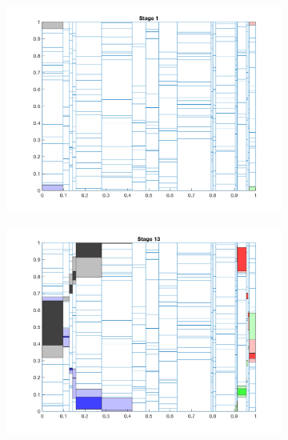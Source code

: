 \documentclass[11pt, letterpaper,titlepage,oneside]{article}
\begin{document}
\begin{figure}[H]
  \centering
  \begin{subfigure}{0.49\textwidth}
  \includegraphics[scale=0.5]{../figures/random_partition_1.png}
  \end{subfigure}
  \begin{subfigure}{0.49\textwidth}
  \includegraphics[scale=0.5]{../figures/random_partition_2.png}
  \end{subfigure}
  \begin{subfigure}{0.49\textwidth}

\end{subfigure}
\end{figure}
\end{document}
